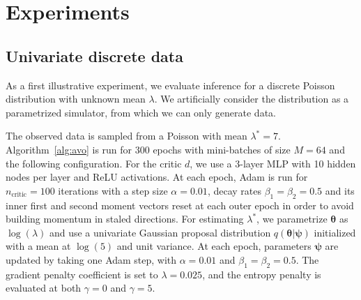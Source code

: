 \documentclass[twocolumn,superscriptaddress,aps]{revtex4-1}
\newcommand{\bftheta}{{\bm \theta}}
\newcommand{\bfpsi}{{\bm \psi}}
\theoremstyle{plain}
\begin{document}

\section{Experiments}

\subsection{Univariate discrete data}

As a first illustrative experiment, we evaluate inference for a discrete Poisson
distribution with unknown mean $\lambda$. We artificially consider
the distribution as a parametrized simulator, from which we can only
generate data.

The observed data is sampled from a Poisson with mean $\lambda^* = 7$.
Algorithm~\ref{alg:avo} is run for 300 epochs with mini-batches of size $M=64$
and the following configuration. For the critic $d$, we use a 3-layer MLP with 10
hidden nodes per layer and ReLU activations. At each epoch, Adam is run for
$n_\text{critic}=100$ iterations with a step size $\alpha=0.01$, decay rates
$\beta_1=\beta_2=0.5$ and its inner first and second moment vectors reset at
each outer epoch in order to avoid building momentum in staled directions.  For
estimating $\lambda^*$, we parametrize $\bftheta$ as $\log(\lambda)$ and use a univariate Gaussian proposal distribution
$q(\bftheta|\bfpsi)$ initialized with a mean at $\log(5)$ and unit variance. At
each epoch, parameters $\bfpsi$ are updated by taking one Adam step, with
$\alpha=0.01$ and $\beta_1=\beta_2=0.5$. The gradient penalty coefficient is set to
$\lambda=0.025$, and the entropy penalty is evaluated at both $\gamma=0$ and $\gamma=5$.
\end{document}
